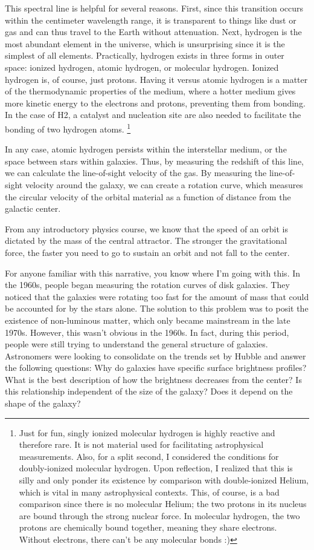 This spectral line is helpful for several reasons. First, since this transition occurs within the centimeter wavelength range, it is transparent to things like dust or gas and can thus travel to the Earth without attenuation. Next, hydrogen is the most abundant element in the universe, which is unsurprising since it is the simplest of all elements. Practically, hydrogen exists in three forms in outer space: ionized hydrogen, atomic hydrogen, or molecular hydrogen. Ionized hydrogen is, of course, just protons. Having it versus atomic hydrogen is a matter of the thermodynamic properties of the medium, where a hotter medium gives more kinetic energy to the electrons and protons, preventing them from bonding. In the case of H2, a catalyst and nucleation site are also needed to facilitate the bonding of two hydrogen atoms. \footnote{Just for fun, singly ionized molecular hydrogen is highly reactive and therefore rare. It is not material used for facilitating astrophysical measurements. Also, for a split second, I considered the conditions for doubly-ionized molecular hydrogen. Upon reflection, I realized that this is silly and only ponder its existence by comparison with double-ionized Helium, which is vital in many astrophysical contexts. This, of course, is a bad comparison since there is no molecular Helium; the two protons in its nucleus are bound through the strong nuclear force. In molecular hydrogen, the two protons are chemically bound together, meaning they share electrons. Without electrons, there can't be any molecular bonds :)}

In any case, atomic hydrogen persists within the interstellar medium, or the space between stars within galaxies. Thus, by measuring the redshift of this line, we can calculate the line-of-sight velocity of the gas. By measuring the line-of-sight velocity around the galaxy, we can create a rotation curve, which measures the circular velocity of the orbital material as a function of distance from the galactic center. 

From any introductory physics course, we know that the speed of an orbit is dictated by the mass of the central attractor. The stronger the gravitational force, the faster you need to go to sustain an orbit and not fall to the center. 

For anyone familiar with this narrative, you know where I'm going with this. In the 1960s, people began measuring the rotation curves of disk galaxies. They noticed that the galaxies were rotating too fast for the amount of mass that could be accounted for by the stars alone. The solution to this problem was to posit the existence of non-luminous matter, which only became mainstream in the late 1970s. However, this wasn't obvious in the 1960s. In fact, during this period, people were still trying to understand the general structure of galaxies. Astronomers were looking to consolidate on the trends set by Hubble and answer the following questions: Why do galaxies have specific surface brightness profiles? What is the best description of how the brightness decreases from the center? Is this relationship independent of the size of the galaxy? Does it depend on the shape of the galaxy? 

